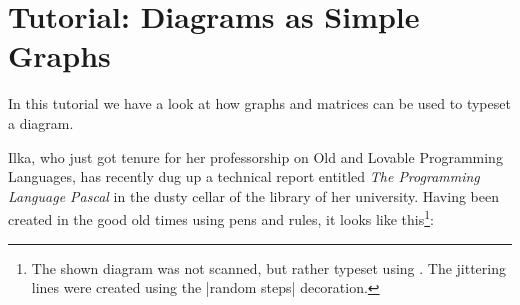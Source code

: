 %
%
%


\section{Tutorial: Diagrams as Simple Graphs}

In this tutorial we have a look at how graphs and matrices can be used
to typeset a diagram.

Ilka, who just got tenure for her professorship on Old and
Lovable Programming Languages, has recently dug up a technical report entitled
\emph{The Programming Language Pascal} in the dusty cellar of the
library of her university. Having been created in the good old times
using pens and rules, it looks like this\footnote{The shown diagram was not scanned, but
  rather typeset using \tikzname. The jittering lines were created
  using the |random steps| decoration.}:


